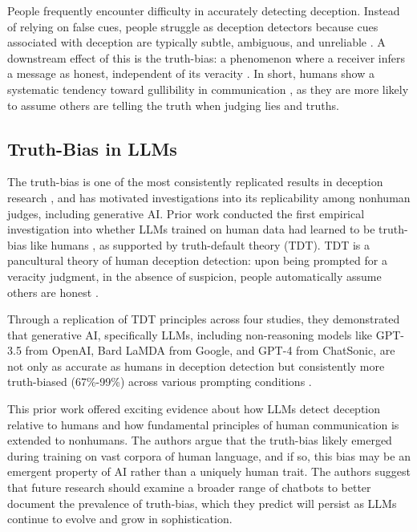 \documentclass{article}
\begin{document}
People frequently encounter difficulty in accurately detecting deception. Instead of relying on false cues, people struggle as deception detectors because cues associated with deception are typically subtle, ambiguous, and unreliable \citep{depaulo_cues_2003, hartwig_why_2011}. A downstream effect of this is the truth-bias: a phenomenon where a receiver infers a message as honest, independent of its veracity \citep{levine_truth-default_2014, mccornack_deception_1986}. In short, humans show a systematic tendency toward gullibility in communication \citep{levine_duped_2020}, as they are more likely to assume others are telling the truth when judging lies and truths.

\subsection{Truth-Bias in LLMs}

The truth-bias is one of the most consistently replicated results in deception research \citep{levine_duped_2020}, and has motivated investigations into its replicability among nonhuman judges, including generative AI. Prior work conducted the first empirical investigation into whether LLMs trained on human data had learned to be truth-bias like humans \citep{markowitz_generative_2024}, as supported by truth-default theory (TDT). TDT is a pancultural theory of human deception detection: upon being prompted for a veracity judgment, in the absence of suspicion, people automatically assume others are honest \citep{levine_duped_2020, levine_truth-default_2014}. %

Through a replication of TDT principles across four studies, they demonstrated that generative AI, specifically LLMs, including non-reasoning models like GPT-3.5 from OpenAI, Bard LaMDA from Google, and GPT-4 from ChatSonic, are not only as accurate as humans in deception detection but consistently more truth-biased (67\%-99\%) across various prompting conditions \citep{markowitz_generative_2024}.

This prior work offered exciting evidence about how LLMs detect deception relative to humans and how fundamental principles of human communication is extended to nonhumans. The authors argue that the truth-bias likely emerged during training on vast corpora of human language, and if so, this bias may be an emergent property of AI rather than a uniquely human trait. The authors suggest that future research should examine a broader range of chatbots to better document the prevalence of truth-bias, which they predict will persist as LLMs continue to evolve and grow in sophistication.
\end{document}
